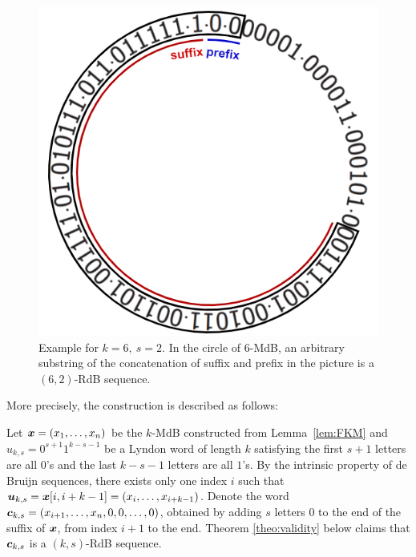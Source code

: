 \begin{figure}[htbp]
    \centering
    \includegraphics[scale=0.5]{fig/construction/subtring of cyclic.png}
    \caption{Example for $k=6,\ s=2$. In the circle of $6$-MdB, an arbitrary substring of the concatenation of suffix and prefix in the picture is a $(6,2)$-RdB sequence.}
    \label{fig:substring_of_circle}
\end{figure}

%     

More precisely, the construction is described as follows:
\begin{construction}\label{constr:encoder}
    Let ${\boldsymbol x}=(x_{1},\ldots,x_{n})$ be the $k$-MdB constructed from Lemma~\ref{lem:FKM} and $u_{k,s}= 0^{s+1}1^{k-s-1}$ be a Lyndon word of length $k$ satisfying the first $s+1$ letters are all $0$'s and the last $k-s-1$ letters are all $1$'s. By the intrinsic property of de Bruijn sequences, there exists only one index $i$ such that ${\boldsymbol u}_{k,s}={\boldsymbol x}[i,i+k-1]=(x_{i},\ldots,x_{i+k-1})$. Denote the word ${\boldsymbol c}_{k,s} = (x_{i+1},\ldots,x_{n},0,0,\ldots,0)$, obtained by adding $s$ letters $0$ to the end of the suffix of ${\boldsymbol x}$, from index $i+1$ to the end. Theorem \ref{theo:validity} below claims that ${\boldsymbol c}_{k,s}$ is a $(k,s)$-RdB sequence. 
\end{construction}

